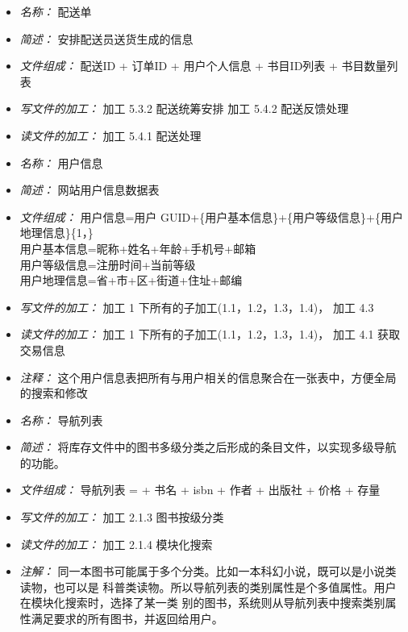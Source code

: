\vspace{-1mm}


\begin{itemize}
\item \textit{名称： }配送单
\item \textit{简述： } 安排配送员送货生成的信息
\item \textit{文件组成： } 配送ID + 订单ID + 用户个人信息 + 书目ID列表 + 书目数量列表 
\item \textit{写文件的加工： }加工 5.3.2 配送统筹安排 加工 5.4.2 配送反馈处理 
\item \textit{读文件的加工： }加工 5.4.1 配送处理

\end{itemize}


\vspace{-1mm}


\begin{itemize}
\item \textit{名称： } 用户信息
\item \textit{简述： } 网站用户信息数据表
\item \textit{文件组成： } 用户信息=用户 GUID+\{用户基本信息\}+\{用户等级信息\}+\{用户地理信息\}\{1，\} \\ 用户基本信息=昵称+姓名+年龄+手机号+邮箱 \\
用户等级信息=注册时间+当前等级 \\
用户地理信息=省+市+区+街道+住址+邮编
\item \textit{写文件的加工： } 加工 1 下所有的子加工(1.1，1.2，1.3，1.4)， 加工 4.3
\item \textit{读文件的加工： } 加工 1 下所有的子加工(1.1，1.2，1.3，1.4)， 加工 4.1 获取交易信息 
\item \textit{注释： } 这个用户信息表把所有与用户相关的信息聚合在一张表中，方便全局的搜索和修改

\end{itemize}


\vspace{-1mm}


\begin{itemize}
\item \textit{名称： }导航列表 
\item \textit{简述： }将库存文件中的图书多级分类之后形成的条目文件，以实现多级导航的功能。 
\item \textit{文件组成： }导航列表 = + 书名 + isbn + 作者 + 出版社 + 价格 + 存量 
\item \textit{写文件的加工： }加工 2.1.3 图书按级分类
\item \textit{读文件的加工： }加工 2.1.4 模块化搜索 
\item \textit{注解： }同一本图书可能属于多个分类。比如一本科幻小说，既可以是小说类读物，也可以是 科普类读物。所以导航列表的类别属性是个多值属性。用户在模块化搜索时，选择了某一类 别的图书，系统则从导航列表中搜索类别属性满足要求的所有图书，并返回给用户。

\end{itemize}


